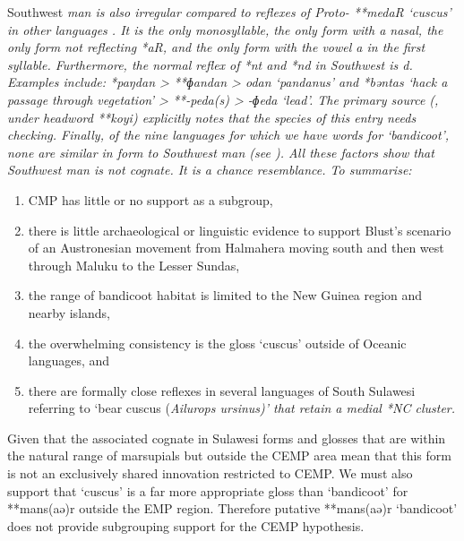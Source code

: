 Southwest  \it{man} is also irregular compared to reflexes
of Proto- **medaR ‘cuscus’ in other  languages \citep[264]{Schapper2011}.
It is the only monosyllable,
the only form with a nasal,
the only form not reflecting *aR,
and the only  form with the vowel \it{a} in the first syllable.
Furthermore, the normal reflex of *nt and *nd in Southwest  is \it{d}.
Examples include: *paŋdan > **ɸandan > \it{odan} `pandanus' and
*bəntas `hack a passage through vegetation' > **-peda(s) > \it{-ɸeda} `lead'.
The primary source (\citealt{Nivens2017},
under headword **koyi) explicitly notes that the species of this entry needs checking.
Finally, of the nine  languages for which we have words
for ‘bandicoot’, none are similar in form to Southwest  \it{man} (see
).
All these factors show that Southwest  \it{man} is not cognate.
It is a chance resemblance.
To summarise:

\begin{enumerate}
	\item	CMP has little or no support as a subgroup,
	\item	there is little archaeological or linguistic evidence to
				support Blust’s scenario of an Austronesian movement from Halmahera
				moving south and then west through Maluku to the Lesser Sundas,
	\item	the range of bandicoot habitat is limited to the New Guinea
				region and nearby islands,
	\item	the overwhelming consistency is the
				gloss ‘cuscus’
				outside of Oceanic languages, and
	\item	there are formally close reflexes in several
				languages of South Sulawesi referring to ‘bear cuscus (\it{Ailurops
				ursinus})’ that retain a medial *NC cluster.
\end{enumerate}

Given that the associated cognate in Sulawesi forms
and glosses that are within the natural range of marsupials but
outside the CEMP area mean that this form is not an exclusively
shared innovation restricted to CEMP.
We must also support \citet{Schapper2011} that ‘cuscus’ is a far
more appropriate gloss than ‘bandicoot’ for **mans(aə)r outside
the EMP region.
Therefore putative **mans(aə)r `bandicoot' does
not provide subgrouping support for
the CEMP hypothesis.